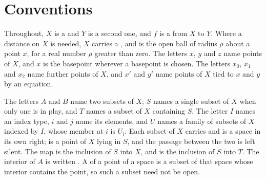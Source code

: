 \section*{Conventions}\label{sec:conventions}

Throughout, $X$ is a  and $Y$ is a
second one, and $f$ is a  from $X$ to
$Y$.  Where a distance on $X$ is needed, $X$ carries a
, and
 is the open ball of radius $\rho$ about
a point $x$, for a real number $\rho$ greater than zero.  The letters $x$, $y$
and $z$ name points of $X$, and $x$ is the basepoint wherever a basepoint is
chosen.  The letters $x_{0}$, $x_{1}$ and $x_{2}$ name further points of $X$,
and $x'$ and $y'$ name points of $X$ tied to $x$ and $y$ by an equation.

The letters $A$ and $B$ name two subsets of $X$; $S$ names a single subset of
$X$ when only one is in play, and $T$ names a subset of $X$ containing $S$.  The
letter $I$ names an index type, $i$ and $j$ name its elements, and $U$ names a
family of subsets of $X$ indexed by $I$, whose member at $i$ is $U_{i}$.  Each
subset of $X$ carries  and is a space in its own right;  is a point of $X$ lying in $S$, and the passage between the two is left
silent.  The map  is the
inclusion of $S$ into $X$, and
 is the inclusion of $S$ into
$T$.  The interior of $A$ is written .  A
 of a point of a space is a subset of that space
whose interior contains the point, so such a subset need not be open.

